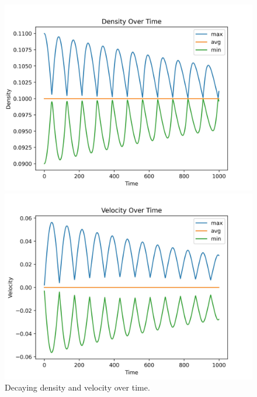 \begin{center}
    \begin{figure}[H]
        \begin{minipage}{0.5\textwidth}
            \includegraphics[width=\linewidth]{graphs/ShearWaveDecay/DensityDistribution/density_aggregate_over_time.jpg}
        \end{minipage}%
        \begin{minipage}{0.5\textwidth}
            \includegraphics[width=\linewidth]{graphs/ShearWaveDecay/DensityDistribution/velocity_aggregate_over_time.jpg}
        \end{minipage}
        \caption{Decaying density and velocity over time.}
        \label{fig:swd-decay}
    \end{figure}
\end{center}

